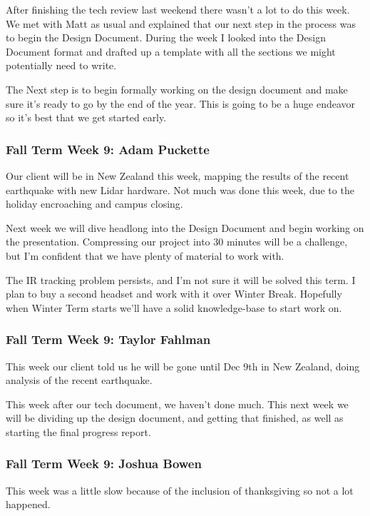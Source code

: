 \documentclass[draftclsnofoot,onecolumn]{IEEEtran}
\begin{document}
After finishing the tech review last weekend there wasn't a lot to do this week. We met with Matt as usual and explained that our next step in the process was to begin the Design Document. During the week I looked into the Design Document format and drafted up a template with all the sections we might potentially need to write.

The Next step is to begin formally working on the design document and make sure it's ready to go by the end of the year. This is going to be a huge endeavor so it's best that we get started early.

\subsubsection{Fall Term Week 9: Adam Puckette}

Our client will be in New Zealand this week, mapping the results of the recent earthquake with new Lidar hardware. Not much was done this week, due to the holiday encroaching and campus closing.

Next week we will dive headlong into the Design Document and begin working on the presentation. Compressing our project into 30 minutes will be a challenge, but I'm confident that we have plenty of material to work with.

The IR tracking problem persists, and I'm not sure it will be solved this term. I plan to buy a second headset and work with it over Winter Break. Hopefully when Winter Term starts we'll have a solid knowledge-base to start work on.

\subsubsection{Fall Term Week 9: Taylor Fahlman}

This week our client told us he will be gone until Dec 9th in New Zealand, doing analysis of the recent earthquake.

This week after our tech document, we haven't done much. This next week we will be dividing up the design document, and getting that finished, as well as starting the final progress report.

\subsubsection{Fall Term Week 9: Joshua Bowen}

This week was a little slow because of the inclusion of thanksgiving so not a lot happened.
\end{document}
